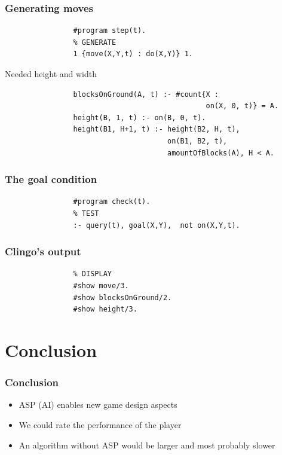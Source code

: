 \documentclass[12pt]{beamer}
\begin{document}
        \begin{frame}[fragile]
            \frametitle{Generating moves}
            \begin{lstlisting}
                #program step(t).
                % GENERATE
                1 {move(X,Y,t) : do(X,Y)} 1.
            \end{lstlisting}
        \end{frame}  

        \begin{frame}[fragile]{Needed height and width}
            \small
            \begin{lstlisting}
                blocksOnGround(A, t) :- #count{X :
                                               on(X, 0, t)} = A.
                height(B, 1, t) :- on(B, 0, t).
                height(B1, H+1, t) :- height(B2, H, t),
                                      on(B1, B2, t),
                                      amountOfBlocks(A), H < A.
            \end{lstlisting}
        \end{frame}
        
        \begin{frame}[fragile]
            \frametitle{The goal condition}
            \begin{lstlisting}
                #program check(t).
                % TEST
                :- query(t), goal(X,Y),  not on(X,Y,t).
            \end{lstlisting}
        \end{frame}

        \begin{frame}[fragile]
            \frametitle{Clingo's output}
            \begin{lstlisting}
                % DISPLAY
                #show move/3.
                #show blocksOnGround/2.
                #show height/3.
            \end{lstlisting}
        \end{frame}
    
    \section{Conclusion}
        \begin{frame}[fragile]
            \frametitle{Conclusion}
            \begin{itemize}
                \item ASP (AI) enables new game design aspects
                \item We could rate the performance of the player
                \item An algorithm without ASP would be larger
                      and most probably slower
            \end{itemize}
        \end{frame}
\end{document}
